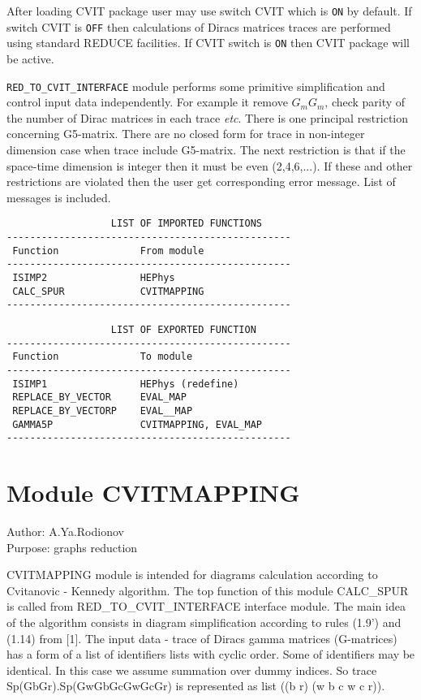 After loading CVIT package user may use switch CVIT which is {\tt ON} by
default.  If switch CVIT is {\tt OFF} then calculations of Diracs matrices
traces are performed using standard REDUCE facilities. If CVIT switch
is {\tt ON} then CVIT package will be active.

{\tt RED\_TO\_CVIT\_INTERFACE} module performs some primitive simplification
and control input data independently.  For example it remove $G_mG_m$,
check parity of the number of Dirac matrices in each trace {\em etc}.
There is one principal restriction concerning G5-matrix. There are no
closed form for trace in non-integer dimension case when trace include
G5-matrix.  The next restriction is that if the space-time dimension
is integer then it must be even (2,4,6,...).  If these and other
restrictions are violated then the user get corresponding error
message. List of messages is included.

\begin{center}
\begin{verbatim}
                  LIST OF IMPORTED FUNCTIONS
-------------------------------------------------
 Function              From module
-------------------------------------------------
 ISIMP2                HEPhys
 CALC_SPUR             CVITMAPPING
-------------------------------------------------
\end{verbatim}

\begin{verbatim}
                  LIST OF EXPORTED FUNCTION
-------------------------------------------------
 Function              To module
-------------------------------------------------
 ISIMP1                HEPhys (redefine)
 REPLACE_BY_VECTOR     EVAL_MAP
 REPLACE_BY_VECTORP    EVAL__MAP
 GAMMA5P               CVITMAPPING, EVAL_MAP
-------------------------------------------------
\end{verbatim}
\end{center}



\section*{Module CVITMAPPING}

\begin{center}
Author: A.Ya.Rodionov \\
Purpose: graphs reduction
\end{center}

CVITMAPPING module is intended for diagrams calculation according to
Cvitanovic - Kennedy algorithm. The top function of this module
CALC\_SPUR is called from RED\_TO\_CVIT\_INTERFACE interface module.
The main idea of the algorithm consists in diagram simplification
according to rules (1.9') and (1.14) from [1].  The input data - trace
of Diracs gamma matrices (G-matrices) has a form of a list of
identifiers lists with cyclic order. Some of identifiers may be
identical.  In this case we assume summation over dummy indices. So
trace Sp(GbGr).Sp(GwGbGcGwGcGr) is represented as list ((b r) (w b c w
c r)).

